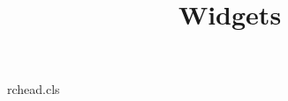 \begin{filecontents*}[overwrite]{rchead.cls}
\def\rc@short{}
\newcommand\shorttitlerun[1]{\def\rc@short{#1}}
\def\rc@vol{}
\newcommand\volnum[1]{\def\rc@vol{#1}}
\newsavebox\rc@headbox
\renewcommand\maketitle{\markboth{\rc@short}{\rc@short}\global\setbox\rc@headbox=\hbox{Vol. \rc@vol}\begin{center}\Large\@title\end{center}}
\end{filecontents*}
\documentclass{rchead}
\title{Widgets}

\maketitle
Text.

